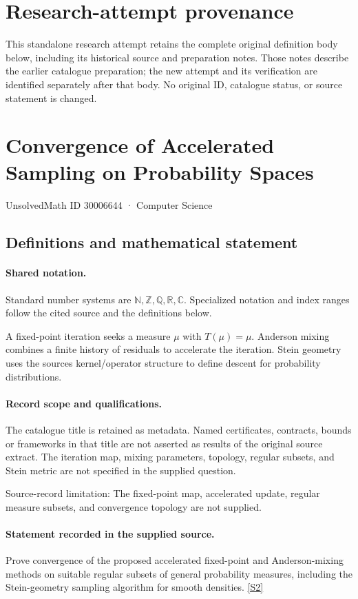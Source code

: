 \documentclass[11pt]{article}
\begin{document}
\section*{Research-attempt provenance}
This standalone research attempt retains the complete original definition body below,
including its historical source and preparation notes. Those notes describe the
earlier catalogue preparation; the new attempt and its verification are identified
separately after that body. No original ID, catalogue status, or source statement is changed.

\section{Convergence of Accelerated Sampling on Probability Spaces}\label{30006644}
{\small UnsolvedMath ID 30006644 · Computer Science}
\subsection{Definitions and mathematical statement}

\paragraph{Shared notation.}Standard number systems are $\mathbb N,\mathbb Z,\mathbb Q,\mathbb R,\mathbb C$. Specialized notation and index ranges follow the cited source and the definitions below.


A fixed-point iteration seeks a measure $\mu$ with $T(\mu)=\mu$. Anderson mixing combines a finite history of residuals to accelerate the iteration. Stein geometry uses the source\textquotesingle s kernel/operator structure to define descent for probability distributions.
\paragraph{Record scope and qualifications.}
The catalogue title is retained as metadata. Named certificates, contracts, bounds or frameworks in that title are not asserted as results of the original source extract.
The iteration map, mixing parameters, topology, regular subsets, and Stein metric are not specified in the supplied question.

Source-record limitation: The fixed-point map, accelerated update, regular measure subsets, and convergence topology are not supplied.
\paragraph{Statement recorded in the supplied source.}
Prove convergence of the proposed accelerated fixed-point and Anderson-mixing methods on suitable regular subsets of general probability measures, including the Stein-geometry sampling algorithm for smooth densities. \href{https://doi.org/10.4171/owr/2026/13}{[S2]}
\end{document}
